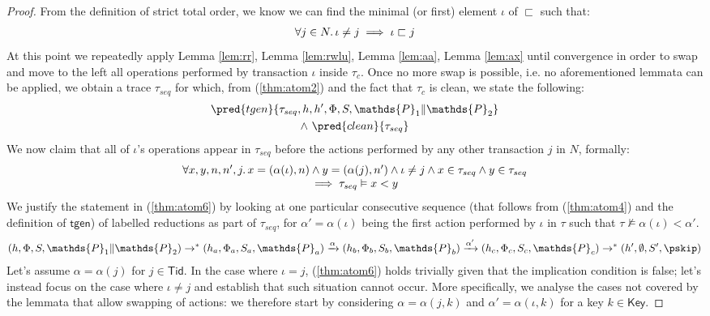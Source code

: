 {\begin{proof}
From the definition of strict total order, we know we can find the minimal (or first) element $\iota$ of $\sqsubset$ such that:
\begin{gather}
	\label{thm:atom3} \forall j \in N \ldotp \iota \neq j \implies \iota \sqsubset j
\end{gather}
At this point we repeatedly apply Lemma \ref{lem:rr}, Lemma \ref{lem:rwlu}, Lemma \ref{lem:aa}, Lemma \ref{lem:ax} until convergence in order to swap and move to the left all operations performed by transaction $\iota$ inside $\tau_c$. Once no more swap is possible, i.e. no aforementioned lemmata can be applied, we obtain a trace $\tau_{seq}$ for which, from (\ref{thm:atom2}) and the fact that $\tau_c$ is clean, we state the following:
\begin{gather}
	\label{thm:atom4} \pred{tgen}{\tau_{seq}, h, h', \Phi, S, \mathds{P}_1 \| \mathds{P}_2} \\
		\land\
	\label{thm:atom7} \pred{clean}{\tau_{seq}}
\end{gather}
We now claim that all of $\iota$'s operations appear in $\tau_{seq}$ before the actions performed by any other transaction $j$ in $N$, formally:
\begin{gather}
	\label{thm:atom6}
	\begin{array}{c}
		\forall x, y, n, n', j \ldotp
	x = (\alpha(\iota), n) \land y = (\alpha(j), n') \land \iota \neq j \land x \in \tau_{seq} \land y \in \tau_{seq} \\
	\implies \tau_{seq} \vDash x < y
	\end{array}
\end{gather}
We justify the statement in (\ref{thm:atom6}) by looking at one particular consecutive sequence (that follows from (\ref{thm:atom4}) and the definition of $\mathsf{tgen}$) of labelled reductions as part of $\tau_{seq}$, for $\alpha' = \alpha(\iota)$ being the first action performed by $\iota$ in $\tau$ such that $\tau \not\vDash \alpha(\iota) < \alpha'$.
\begin{gather*}
	(h, \Phi, S, \mathds{P}_1 \| \mathds{P}_2)
		\rightarrow^*
	(h_a, \Phi_a, S_a, \mathds{P}_a)
		\xrightarrow{\alpha}
	(h_b, \Phi_b, S_b, \mathds{P}_b)
		\xrightarrow{\alpha'}
	(h_c, \Phi_c, S_c, \mathds{P}_c)
		\rightarrow^*
	(h', \emptyset, S', \pskip)
\end{gather*}
Let's assume $\alpha = \alpha(j)$ for $j \in \mathsf{Tid}$. In the case where $\iota = j$, (\ref{thm:atom6}) holds trivially given that the implication condition is false; let's instead focus on the case where $\iota \neq j$ and establish that such situation cannot occur. More specifically, we analyse the cases not covered by the lemmata that allow swapping of actions: we therefore start by considering $\alpha = \alpha(j, k)$ and $\alpha' = \alpha(\iota, k)$ for a key $k \in \mathsf{Key}$.

\end{proof}}
